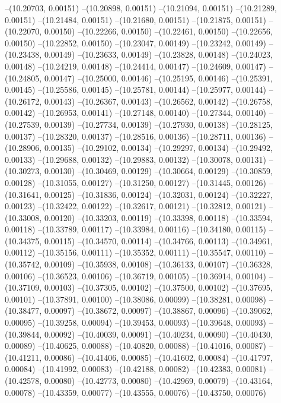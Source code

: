 --(10.20703, 0.00151)
--(10.20898, 0.00151)
--(10.21094, 0.00151)
--(10.21289, 0.00151)
--(10.21484, 0.00151)
--(10.21680, 0.00151)
--(10.21875, 0.00151)
--(10.22070, 0.00150)
--(10.22266, 0.00150)
--(10.22461, 0.00150)
--(10.22656, 0.00150)
--(10.22852, 0.00150)
--(10.23047, 0.00149)
--(10.23242, 0.00149)
--(10.23438, 0.00149)
--(10.23633, 0.00149)
--(10.23828, 0.00148)
--(10.24023, 0.00148)
--(10.24219, 0.00148)
--(10.24414, 0.00147)
--(10.24609, 0.00147)
--(10.24805, 0.00147)
--(10.25000, 0.00146)
--(10.25195, 0.00146)
--(10.25391, 0.00145)
--(10.25586, 0.00145)
--(10.25781, 0.00144)
--(10.25977, 0.00144)
--(10.26172, 0.00143)
--(10.26367, 0.00143)
--(10.26562, 0.00142)
--(10.26758, 0.00142)
--(10.26953, 0.00141)
--(10.27148, 0.00140)
--(10.27344, 0.00140)
--(10.27539, 0.00139)
--(10.27734, 0.00139)
--(10.27930, 0.00138)
--(10.28125, 0.00137)
--(10.28320, 0.00137)
--(10.28516, 0.00136)
--(10.28711, 0.00136)
--(10.28906, 0.00135)
--(10.29102, 0.00134)
--(10.29297, 0.00134)
--(10.29492, 0.00133)
--(10.29688, 0.00132)
--(10.29883, 0.00132)
--(10.30078, 0.00131)
--(10.30273, 0.00130)
--(10.30469, 0.00129)
--(10.30664, 0.00129)
--(10.30859, 0.00128)
--(10.31055, 0.00127)
--(10.31250, 0.00127)
--(10.31445, 0.00126)
--(10.31641, 0.00125)
--(10.31836, 0.00124)
--(10.32031, 0.00124)
--(10.32227, 0.00123)
--(10.32422, 0.00122)
--(10.32617, 0.00121)
--(10.32812, 0.00121)
--(10.33008, 0.00120)
--(10.33203, 0.00119)
--(10.33398, 0.00118)
--(10.33594, 0.00118)
--(10.33789, 0.00117)
--(10.33984, 0.00116)
--(10.34180, 0.00115)
--(10.34375, 0.00115)
--(10.34570, 0.00114)
--(10.34766, 0.00113)
--(10.34961, 0.00112)
--(10.35156, 0.00111)
--(10.35352, 0.00111)
--(10.35547, 0.00110)
--(10.35742, 0.00109)
--(10.35938, 0.00108)
--(10.36133, 0.00107)
--(10.36328, 0.00106)
--(10.36523, 0.00106)
--(10.36719, 0.00105)
--(10.36914, 0.00104)
--(10.37109, 0.00103)
--(10.37305, 0.00102)
--(10.37500, 0.00102)
--(10.37695, 0.00101)
--(10.37891, 0.00100)
--(10.38086, 0.00099)
--(10.38281, 0.00098)
--(10.38477, 0.00097)
--(10.38672, 0.00097)
--(10.38867, 0.00096)
--(10.39062, 0.00095)
--(10.39258, 0.00094)
--(10.39453, 0.00093)
--(10.39648, 0.00093)
--(10.39844, 0.00092)
--(10.40039, 0.00091)
--(10.40234, 0.00090)
--(10.40430, 0.00089)
--(10.40625, 0.00088)
--(10.40820, 0.00088)
--(10.41016, 0.00087)
--(10.41211, 0.00086)
--(10.41406, 0.00085)
--(10.41602, 0.00084)
--(10.41797, 0.00084)
--(10.41992, 0.00083)
--(10.42188, 0.00082)
--(10.42383, 0.00081)
--(10.42578, 0.00080)
--(10.42773, 0.00080)
--(10.42969, 0.00079)
--(10.43164, 0.00078)
--(10.43359, 0.00077)
--(10.43555, 0.00076)
--(10.43750, 0.00076)
